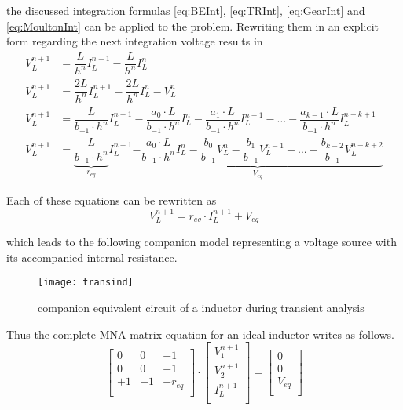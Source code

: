 the discussed integration formulas \eqref{eq:BEInt}, \eqref{eq:TRInt},
\eqref{eq:GearInt} and \eqref{eq:MoultonInt} can be applied to the
problem.  Rewriting them in an explicit form regarding the next
integration voltage results in
\begin{align}
V_L^{n+1} &= \dfrac{L}{h^{n}} I_L^{n+1} - \dfrac{L}{h^{n}} I_L^{n}\\
V_L^{n+1} &= \dfrac{2L}{h^{n}} I_L^{n+1} - \dfrac{2L}{h^{n}} I_L^{n} - V_L^n\\
V_L^{n+1} &= \dfrac{L}{b_{-1}\cdot h^{n}} I_L^{n+1} - \dfrac{a_0\cdot L}{b_{-1}\cdot h^{n}} I_L^{n} - \dfrac{a_1\cdot L}{b_{-1}\cdot h^{n}} I_L^{n-1} - \ldots - \dfrac{a_{k-1}\cdot L}{b_{-1}\cdot h^{n}} I_L^{n-k+1}\\
V_L^{n+1} &= \underbrace{\dfrac{L}{b_{-1}\cdot h^{n}}}_{r_{eq}} I_L^{n+1} \underbrace{- \dfrac{a_0\cdot L}{b_{-1}\cdot h^{n}} I_L^{n} - \dfrac{b_0}{b_{-1}} V_L^n - \dfrac{b_1}{b_{-1}} V_L^{n-1} - \ldots - \dfrac{b_{k-2}}{b_{-1}} V_L^{n-k+2}}_{V_{eq}}
\end{align}

Each of these equations can be rewritten as
\begin{equation}
V_L^{n+1} = r_{eq}\cdot I_L^{n+1} + V_{eq}
\end{equation}

which leads to the following companion model representing a voltage
source with its accompanied internal resistance.
\begin{figure}[ht]
\begin{center}
\texttt{[image: transind]}
\end{center}
\caption{companion equivalent circuit of a inductor during transient analysis}
\end{figure}
\FloatBarrier

Thus the complete MNA matrix equation for an ideal inductor writes
as follows.
\begin{equation}
\begin{bmatrix}
0 & 0 & +1\\
0 & 0 & -1\\
+1 & -1 & -r_{eq}\\
\end{bmatrix}
\cdot
\begin{bmatrix}
V_1^{n+1}\\
V_2^{n+1}\\
I_L^{n+1}\\
\end{bmatrix}
=
\begin{bmatrix}
0\\
0\\
V_{eq}\\
\end{bmatrix}
\end{equation}

